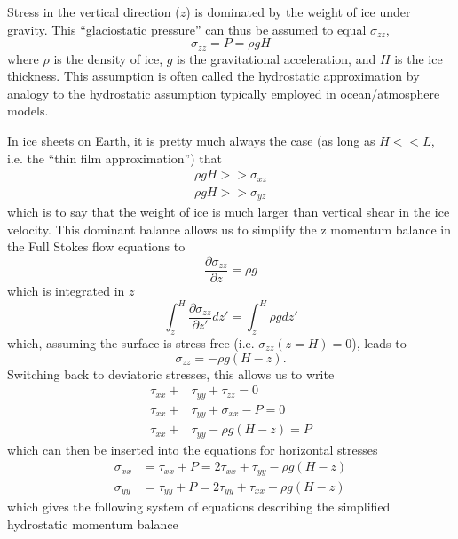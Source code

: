 \documentclass[12pt]{article}
\theoremstyle{definition}
\newcommand{\pd}[2]{\frac{\partial {#1}}{\partial {#2}}}
\begin{document}
Stress in the vertical direction ($z$) is dominated by the weight of ice under gravity. This ``glaciostatic pressure'' can thus be assumed to equal $\sigma_{zz}$, 
\begin{equation}
\sigma_{zz} = P = \rho g H
\end{equation}
where $\rho$ is the density of ice, $g$ is the gravitational acceleration, and $H$ is the ice thickness. This assumption is often called the hydrostatic approximation by analogy to the hydrostatic assumption typically employed in ocean/atmosphere models.

In ice sheets on Earth, it is pretty much always the case (as long as $H<<L$, i.e. the 
``thin film approximation'') that
\begin{align}
\rho g H >> \sigma_{xz} \\
\rho g H >> \sigma_{yz}
\end{align}
which is to say that the weight of ice is much larger than vertical shear in the ice velocity. This dominant balance allows us to simplify the z momentum balance in the Full Stokes flow equations to
\begin{equation}
\pd{\sigma_{zz}}{z} = \rho g
\end{equation}
which is integrated in $z$
\begin{equation}
\int_z^H \pd{\sigma_{zz}}{z'} dz' = \int_z^H \rho g dz'
\end{equation}
which, assuming the surface is stress free (i.e. $\sigma_{zz}(z=H) = 0$), leads to
\begin{equation}
\sigma_{zz} = - \rho g (H-z).
\end{equation}
Switching back to deviatoric stresses, this allows us to write
\begin{align}
\tau_{xx} +& \tau_{yy} + \tau_{zz} = 0 \\
\tau_{xx} +& \tau_{yy} + \sigma_{xx} - P = 0 \\
\tau_{xx} +& \tau_{yy} - \rho g (H - z) = P
\end{align}
which can then be inserted into the equations for horizontal stresses
\begin{align}
\sigma_{xx} &= \tau_{xx} + P = 2 \tau_{xx} + \tau_{yy} - \rho g (H - z) \\
\sigma_{yy} &= \tau_{yy} + P = 2 \tau_{yy} + \tau_{xx} - \rho g (H - z)
\end{align}
which gives the following system of equations describing the simplified hydrostatic momentum balance
\end{document}
